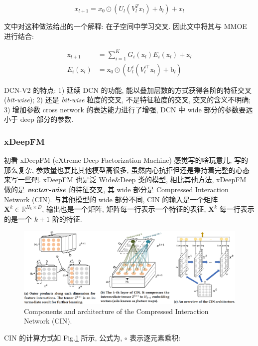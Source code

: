$$
x_{l+1} = x_0 \odot (U_l (V_l^T x_l) + b_l) + x_l
$$

文中对这种做法给出的一个解释: 在子空间中学习交叉. 因此文中将其与 MMOE 进行结合:

$$
\begin{aligned}
	\mathrm{x}_{l+1} &=\sum_{i=1}^K G_i\left(\mathrm{x}_l\right) E_i\left(\mathrm{x}_l\right)+\mathrm{x}_l \\
	E_i\left(\mathrm{x}_l\right) &=\mathrm{x}_0 \odot\left(U_l^i\left(V_l^{i \top} \mathrm{x}_l\right)+\mathrm{b}_l\right)
\end{aligned}
$$

DCN-V2 的特点: 1) 延续 DCN 的功能, 能以叠加层数的方式获得各阶的特征交叉 (\textit{bit-wise}); 2) 还是 \textit{bit-wise} 粒度的交叉, 不是特征粒度的交叉, 交叉的含义不明确; 3) 增加参数 cross network 的表达能力进行了增强, DCN 中 wide 部分的参数要远小于 deep 部分的参数. 

\subsubsection{xDeepFM}

初看 xDeepFM (eXtreme Deep Factorization Machine)\cite{jianxun_xdeepfm_2018} 感觉写的啥玩意儿, 写的那么复杂, 参数量也要比其他模型高很多, 虽然内心抗拒但还是秉持着完整的心态来写一些吧. xDeepFM 也是泛 Wide\&Deep 类的模型, 相比其他方法, xDeepFM 做的是 \textit{\textbf{vector-wise}} 的特征交叉, 其 wide 部分是 Compressed Interaction Network (CIN). 与其他模型的 wide 部分不同, CIN 的输入是一个矩阵 $\bm{X}^k \in \mathbb{R}^{H_k \times D}$, 输出也是一个矩阵, 矩阵每一行表示一个特征的表征, $\bm{X}^k$ 每一行表示的是一个 $k+1$ 阶的特征.

\begin{figure}[h]
	\centering
	\includegraphics[width=1\textwidth]{pics/cin.png}
	\caption{Components and architecture of the Compressed Interaction Network (CIN).}
	\label{fig:cin}
\end{figure} 

CIN 的计算方式如 Fig.\ref{fig:cin} 所示, 公式为, $\circ$ 表示逐元素乘积:

